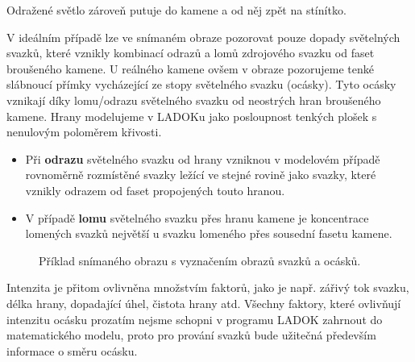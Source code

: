 Odražené světlo zároveň putuje do kamene a od něj zpět na stínítko. 




V ideálním případě lze ve snímaném obraze pozorovat pouze dopady světelných svazků, které vznikly kombinací odrazů a lomů zdrojového svazku od faset broušeného kamene. U reálného kamene ovšem v obraze pozorujeme tenké slábnoucí přímky vycházející ze stopy světelného svazku (ocásky). Tyto ocásky vznikají díky lomu/odrazu světelného svazku od neostrých hran broušeného kamene. Hrany modelujeme v LADOKu jako posloupnost tenkých plošek s nenulovým poloměrem křivosti.
	
\begin{itemize}
	\item Při \textbf{odrazu} světelného svazku od hrany vzniknou v modelovém případě rovnoměrně rozmístěné svazky ležící ve stejné rovině jako svazky, které vznikly odrazem od faset propojených touto hranou.  	

	\item V případě \textbf{lomu} světelného svazku přes hranu kamene je koncentrace lomených svazků největší u svazku lomeného přes sousední fasetu kamene.  
\end{itemize}	  

\begin{figure}[h!]
\begin{center}
\scalebox{.9}{ }
\end{center}
\caption{Příklad snímaného obrazu s vyznačením obrazů svazků a ocásků.}
\label{fig:tail_ex1}
\end{figure}

 Intenzita je přitom ovlivněna množstvím faktorů, jako je např. zářivý tok svazku, délka hrany, dopadající úhel, čistota hrany atd. Všechny faktory, které ovlivňují intenzitu ocásku prozatím nejsme schopni v programu LADOK zahrnout do matematického modelu, proto pro prování svazků bude užitečná především informace o směru ocásku. 
 
